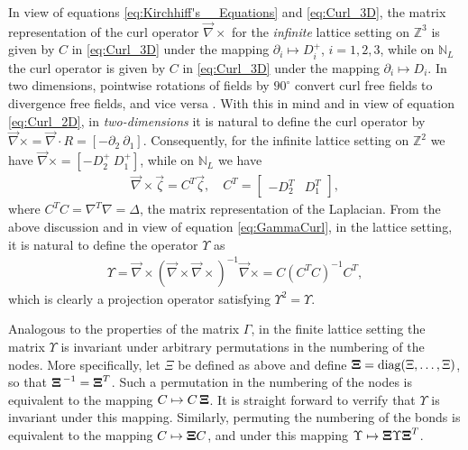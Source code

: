\documentclass{cmslatex}
\newcommand\bXi{\mbox{\boldmath${\Xi}$}}
\begin{document}
In view of equations \eqref{eq:Kirchhiff's__Equations} and
\eqref{eq:Curl_3D}, the matrix representation of the curl operator
$\vec{\nabla}\times$ for the \emph{infinite} lattice setting on $\mathbb{Z}^3$
is given by $C$ in \eqref{eq:Curl_3D} under the mapping $\partial_i\mapsto D^+_i$,
$i=1,2,3$, while on $\mathbb{N}_L$ the curl operator is given by
$C$ in \eqref{eq:Curl_3D} under the mapping $\partial_i\mapsto D_i$. In two
dimensions, pointwise rotations of fields by $90^\circ$ convert curl free
fields to divergence free fields, and vice versa
\cite{MILTON:2002:TC}. With this in mind and in view of equation
\eqref{eq:Curl_2D}, in \emph{two-dimensions} it is natural to define
the curl operator by $\vec{\nabla}\times=\vec{\nabla}\cdot R=[ - \partial_2 \
\partial_1]$. Consequently, for the infinite lattice setting on
$\mathbb{Z}^2$ we have $\vec{\nabla}\times=[ - D^+_2 \ D^+_1]$, while on
$\mathbb{N}_L$ we have  
%
\begin{align}
  \vec{\nabla}\times\vec{\zeta}=C^T\vec{\zeta}, \quad
  C^T=
  \left[
    \begin{array}{ccc}
       -D_2^T  &   D_1^T
    \end{array}
  \right],
\end{align}
%
where $C^TC=\nabla^T\nabla=\Delta$, the matrix representation of the Laplacian. From
the above discussion and in view of equation \eqref{eq:GammaCurl}, in
the lattice setting, it is natural to define the operator $\Upsilon$ as
%
\begin{align}\label{eq:GammaCurl_NL}
  \Upsilon=\vec{\nabla}\times(\vec{\nabla}\times\vec{\nabla}\times)^{-1}\vec{\nabla}\times
   =C(C^TC)^{-1}C^T,
\end{align}
%
which is clearly a projection operator satisfying $\Upsilon^2=\Upsilon$.




Analogous
to the properties of the matrix $\Gamma$, in the finite lattice setting the 
matrix $\Upsilon$ is invariant under arbitrary permutations in the numbering
of the nodes. More specifically, let $\Xi$ be defined as above and
define $\bXi=\text{diag}(\Xi,\ldots,\Xi)$, so that $\bXi^{\,-1}=\bXi^T$. Such a
permutation in the 
numbering of the nodes is equivalent to the mapping
$C\mapsto C\,\bXi$. It is straight forward to verrify that $\Upsilon$ is invariant
under this mapping. Similarly, permuting the numbering of
the bonds is equivalent to the mapping $C\mapsto \bXi C$, and under
this mapping $\Upsilon\mapsto \bXi \Upsilon {\bXi}^T$.  
\end{document}
